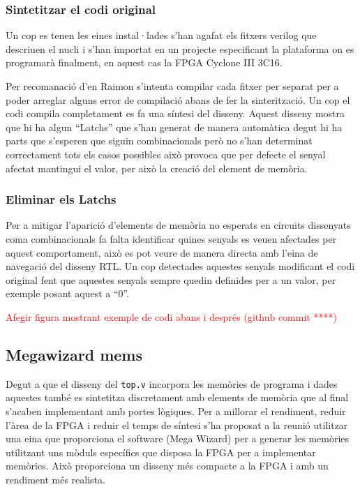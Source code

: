 \documentclass[conference,onecolumn, catalan]{IEEEtran}
\newcommand\todo[1]{\textcolor{red}{#1}}
\begin{document}
\subsubsection{Sintetitzar el codi original }

Un cop es tenen les eines instal·lades s'han agafat els fitxers verilog que descriuen el nucli i s'han importat en un projecte especificant la plataforma on es programarà finalment, en aquest cas la FPGA Cyclone III 3C16. 

Per recomanació d'en Raimon s'intenta compilar cada fitxer per separat per a poder arreglar alguns error de compilació abans de fer la sinterització. Un cop el codi compila completament es fa una síntesi del disseny. Aquest disseny mostra que hi ha algun ``Latchs'' que s'han generat de manera automàtica degut hi ha parts que s'esperen que siguin combinacionals però no s'han determinat correctament tots els casos possibles això provoca que per defecte el senyal afectat mantingui el valor, per això la creació del element de memòria. 

\subsubsection{Eliminar els Latchs }

Per a mitigar l'aparició d'elements de memòria no esperats en circuits dissenyats coma combinacionals fa falta identificar quines senyals es veuen afectades per aquest comportament, això es pot veure de manera directa amb l'eina de navegació del disseny RTL. Un cop detectades aquestes senyals modificant el codi original fent que aquestes senyals sempre quedin definides per a un valor, per exemple posant aquest a ``0''. 

\todo{Afegir figura mostrant exemple de codi abans i després (github commit ****)}


\subsection{Megawizard mems}

Degut a que el disseny del \verb|top.v| incorpora les memòries de programa i dades aquestes també es sintetitza discretament amb elements de memòria que al final s'acaben implementant amb portes lògiques. Per a millorar el rendiment, reduir l'àrea de la FPGA i reduir el temps de síntesi s'ha proposat a la reunió utilitzar una eina que proporciona el software (Mega Wizard) per a generar les memòries utilitzant uns mòduls específics que disposa la FPGA per a implementar memòries. Això proporciona un disseny més compacte a la FPGA i amb un rendiment més realista.
\end{document}
